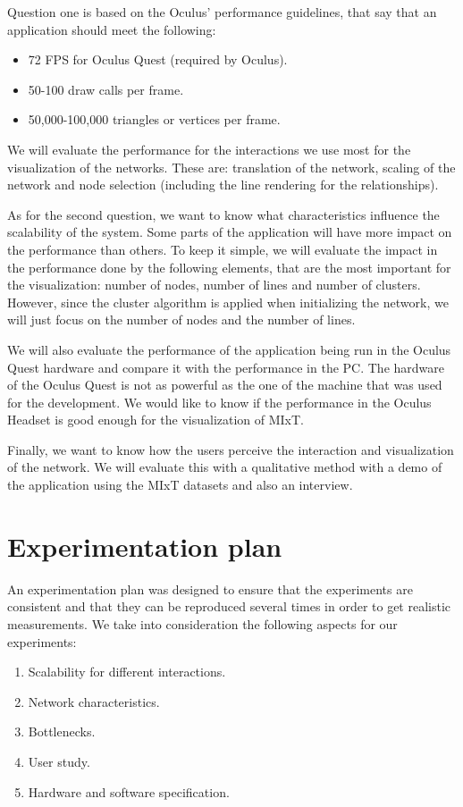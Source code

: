 Question one is based on the Oculus' performance guidelines\cite{oculus_performance_baselines}, that say that an application should meet the following:
\begin{itemize}
  \item 72 FPS for Oculus Quest (required by Oculus).
  \item 50-100 draw calls per frame.
  \item 50,000-100,000 triangles or vertices per frame.
\end{itemize}

We will evaluate the performance for the interactions we use most for the visualization of the networks. These are: translation of the network, scaling of the network and node selection (including the line rendering for the relationships).

As for the second question, we want to know what characteristics influence the scalability of the system. Some parts of the application will have more impact on the performance than others. To keep it simple, we will evaluate the impact in the performance done by the following elements, that are the most important for the visualization: number of nodes,  number of lines and number of clusters. However, since the cluster algorithm is applied when initializing the network, we will just focus on the number of nodes and the number of lines.

We will also evaluate the performance of the application being run in the Oculus Quest hardware and compare it with the performance in the PC. The hardware of the Oculus Quest is not as powerful as the one of the machine that was used for the development. We would like to know if the performance in the Oculus Headset is good enough for the visualization of MIxT.

Finally, we want to know how the users perceive the interaction and visualization of the network. We will evaluate this with a qualitative method with a demo of the application using the MIxT datasets and also an interview.

\section{Experimentation plan}
An experimentation plan was designed to ensure that the experiments are consistent and that they can be reproduced several times in order to get realistic measurements. We take into consideration the following aspects for our experiments:
\begin{enumerate}
  \item Scalability for different interactions.
  \item Network characteristics.
  \item Bottlenecks.
  \item User study.
  \item Hardware and software specification.
\end{enumerate}

